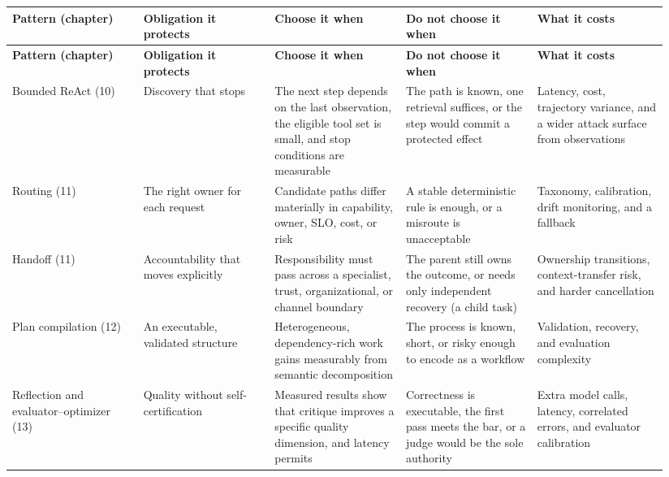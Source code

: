 \BookTableStart
\fontsize{7.2}{9}\selectfont
\begin{longtable}{@{}Y{0.1880\linewidth}Y{0.1880\linewidth}Y{0.1880\linewidth}Y{0.1880\linewidth}Y{0.1880\linewidth}@{}}
\color{white}\bfseries \textbf{Pattern (chapter)} & \color{white}\bfseries \textbf{Obligation it protects} & \color{white}\bfseries \textbf{Choose it when} & \color{white}\bfseries \textbf{Do not choose it when} & \color{white}\bfseries \textbf{What it costs} \\
\endfirsthead
{}
\color{white}\bfseries \textbf{Pattern (chapter)} & \color{white}\bfseries \textbf{Obligation it protects} & \color{white}\bfseries \textbf{Choose it when} & \color{white}\bfseries \textbf{Do not choose it when} & \color{white}\bfseries \textbf{What it costs} \\
\endhead
Bounded ReAct (10) & Discovery that stops & The next step depends on the last observation, the eligible tool set is small, and stop conditions are measurable & The path is known, one retrieval suffices, or the step would commit a protected effect & Latency, cost, trajectory variance, and a wider attack surface from observations \\
Routing (11) & The right owner for each request & Candidate paths differ materially in capability, owner, SLO, cost, or risk & A stable deterministic rule is enough, or a misroute is unacceptable & Taxonomy, calibration, drift monitoring, and a fallback \\
Handoff (11) & Accountability that moves explicitly & Responsibility must pass across a specialist, trust, organizational, or channel boundary & The parent still owns the outcome, or needs only independent recovery (a child task) & Ownership transitions, context-transfer risk, and harder cancellation \\
Plan compilation (12) & An executable, validated structure & Heterogeneous, dependency-rich work gains measurably from semantic decomposition & The process is known, short, or risky enough to encode as a workflow & Validation, recovery, and evaluation complexity \\
Reflection and evaluator–optimizer (13) & Quality without self-certification & Measured results show that critique improves a specific quality dimension, and latency permits & Correctness is executable, the first pass meets the bar, or a judge would be the sole authority & Extra model calls, latency, correlated errors, and evaluator calibration \\

\end{longtable}
